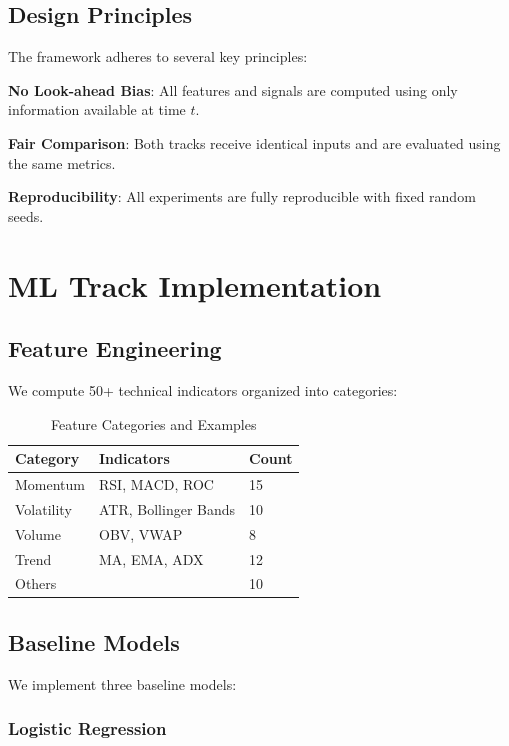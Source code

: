 \subsection{Design Principles}

The framework adheres to several key principles:

\textbf{No Look-ahead Bias}: All features and signals are computed using only information available at time $t$.

\textbf{Fair Comparison}: Both tracks receive identical inputs and are evaluated using the same metrics.

\textbf{Reproducibility}: All experiments are fully reproducible with fixed random seeds.

\section{ML Track Implementation}

\subsection{Feature Engineering}

We compute 50+ technical indicators organized into categories:

\begin{table}[h]
\centering
\caption{Feature Categories and Examples}
\begin{tabular}{lll}
\toprule
Category & Indicators & Count \\
\midrule
Momentum & RSI, MACD, ROC & 15 \\
Volatility & ATR, Bollinger Bands & 10 \\
Volume & OBV, VWAP & 8 \\
Trend & MA, EMA, ADX & 12 \\
Others & & 10 \\
\bottomrule
\end{tabular}
\end{table}

\subsection{Baseline Models}

We implement three baseline models:

\subsubsection{Logistic Regression}


